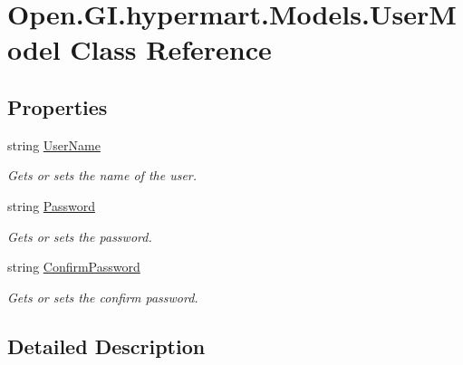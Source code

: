 \hypertarget{class_open_1_1_g_i_1_1hypermart_1_1_models_1_1_user_model}{}\section{Open.\+G\+I.\+hypermart.\+Models.\+User\+Model Class Reference}
\label{class_open_1_1_g_i_1_1hypermart_1_1_models_1_1_user_model}


 


\subsection*{Properties}
\begin{DoxyCompactItemize}
\item 
string \hyperlink{class_open_1_1_g_i_1_1hypermart_1_1_models_1_1_user_model_aa873e73ce7a4470c31e78f7cc86c25ad}{User\+Name}
\begin{DoxyCompactList}\small\item\em Gets or sets the name of the user. \end{DoxyCompactList}\item 
string \hyperlink{class_open_1_1_g_i_1_1hypermart_1_1_models_1_1_user_model_a7444f518307d0a5ee95b237243a26247}{Password}
\begin{DoxyCompactList}\small\item\em Gets or sets the password. \end{DoxyCompactList}\item 
string \hyperlink{class_open_1_1_g_i_1_1hypermart_1_1_models_1_1_user_model_a671662415ad880aaf5c2e7b43a83faa9}{Confirm\+Password}
\begin{DoxyCompactList}\small\item\em Gets or sets the confirm password. \end{DoxyCompactList}\end{DoxyCompactItemize}


\subsection{Detailed Description}





